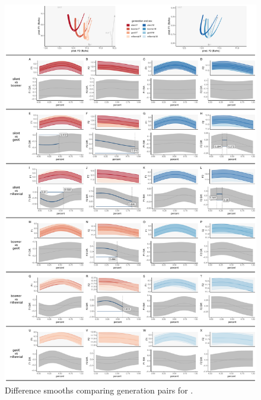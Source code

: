\begin{figure}[p]
    \centering
    \includegraphics[width=\textwidth]{Figures/BET/BET_detailed_generation_panel_plot.pdf}
    \caption{Difference smooths comparing generation pairs for \bet.}
    \label{fig:bet_diff_smooths_gen}
\end{figure}

